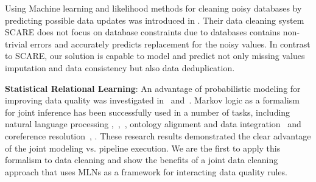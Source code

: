 Using Machine learning and likelihood methods for cleaning noisy databases by predicting possible data updates was introduced in \cite{Yakout:2013:DSU:2463676.2463706}. Their data cleaning system \textsc{SCARE} does not focus on database constraints due to databases contains non-trivial errors and accurately predicts replacement for the noisy values. In contrast to \textsc{SCARE}, our solution is capable to model and predict not only missing values imputation and data consistency but also data deduplication. 

\textbf{Statistical Relational Learning}: An advantage of probabilistic modeling for improving data quality was investigated in~\cite{doi:10.1080/01621459.1972.10481323} and~\cite{chen2011usher}. Markov logic as a formalism for joint inference has been successfully used in a number of tasks, including natural language processing \cite{che2010jointly},~\cite{riedel08collective},~\cite{meza09jointly}, ontology alignment and data integration~\cite{niepert2011probabilistic} and coreference resolution~\cite{poon2008joint}, \cite{singla2006entity}. These research results demonstrated the clear advantage of the joint modeling vs. pipeline execution. We are the first to apply this formalism to data cleaning and show the benefits of a joint data cleaning approach that uses MLNs as a framework for interacting data quality rules. 

